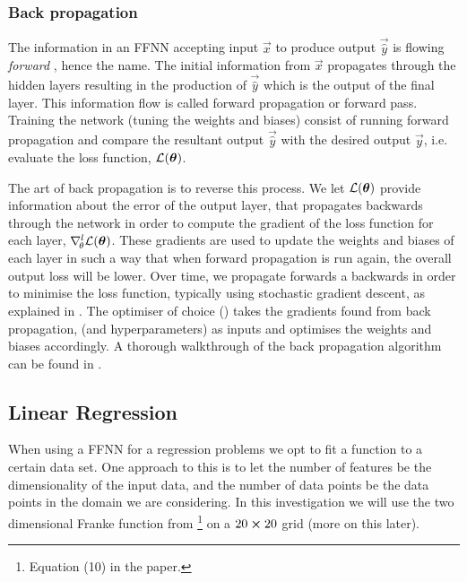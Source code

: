     





    \subsubsection{Back propagation}\label{sec:back_propagation}


    The information in an FFNN accepting input $\vec{x}$ to produce output $\vec{\hat{y}}$ is flowing \textit{forward} \citep{Goodfellow2016}, hence the name. The initial information from $\vec{x}$ propagates through the hidden layers resulting in the production of $\vec{\hat{y}}$ which is the output of the final layer. This information flow is called forward propagation or forward pass. Training the network (tuning the weights and biases) consist of running forward propagation and compare the resultant output $\vec{\hat{y}}$ with the desired output $\vec{y}$, i.e. evaluate the loss function, $\mathcal{L}(\boldsymbol{\theta})$. 
    

    The art of back propagation is to reverse this process. We let $\mathcal{L}(\boldsymbol{\theta})$ provide information about the error of the output layer, that propagates backwards through the network in order to compute the gradient of the loss function for each layer, $\nabla^l_{\!\theta}\mathcal{L}(\boldsymbol{\theta})$. These gradients are used to update the weights and biases of each layer in such a way that when forward propagation is run again, the overall output loss will be lower. Over time, we propagate forwards a backwards in order to minimise the loss function, typically using stochastic gradient descent, as explained in . The optimiser of choice () takes the gradients found from back propagation, (and hyperparameters) as inputs and optimises the weights and biases accordingly. A thorough walkthrough of the back propagation algorithm can be found in \citep[chapter 6.5]{Goodfellow2016}.

\subsection{Linear Regression}\label{sec:regression}
    When using a FFNN for a regression problems we opt to fit a function to a certain data set. One approach to this is to let the number of features be the dimensionality of the input data, and the number of data points be the data points in the domain we are considering. In this investigation we will use the two dimensional Franke function from \projectOne\footnote{Equation (10) in the paper.} on a $20\cross 20$ grid (more on this later).
    
